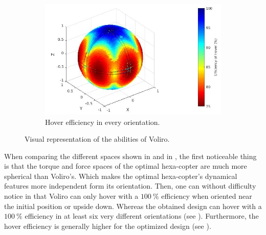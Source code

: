 \begin{figure}[!ht]
\begin{center}
\begin{subfigure}[b]{0.5\textwidth}
    \includegraphics[width=\linewidth]{images/Voliro_hspace.jpg}
    \caption{Hover efficiency in every orientation.} \label{fig:voliro_hspace}
  \end{subfigure}
  \caption{Visual representation of the abilities of Voliro.}
  \label{fig:Voliro_spaces}
  \end{center}
\end{figure}

When comparing the different spaces shown in 
and in , the first noticeable thing is that the torque
and force spaces of the optimal hexa-copter are much more spherical than
Voliro’s. Which makes the optimal hexa-copter’s dynamical features more
independent form its orientation. Then, one can without difficulty notice in
 that Voliro can only hover with a $100\ \%$ efficiency
when oriented near the initial position or upside down. Whereas the obtained
design can hover with a $100\ \%$ efficiency in at least six very different orientations
(see ). Furthermore, the hover efficiency is generally
higher for the optimized design (see ).

\begin{table}[!ht]
\begin{center}
 \caption{Information on the designs’ force space properties.}\vspace{1ex}
 \label{tab:tab_Hexa_compare_force}
\end{center}
\end{table}

